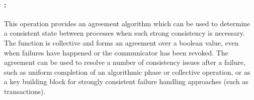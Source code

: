 \paragraph{:}

This operation provides an agreement algorithm which can be used to determine a
consistent state between processes when such strong consistency is
necessary. The function is collective and forms an agreement over a boolean
value, even when failures have happened or the communicator has been
revoked. The agreement can be used to resolve a number of consistency issues
after a failure, such as uniform completion of an algorithmic phase or
collective operation, or as a key building block for strongly consistent failure
handling approaches (such as transactions).
